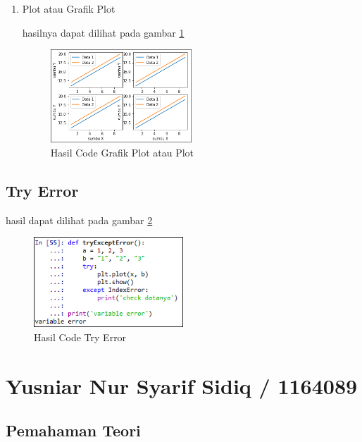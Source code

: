 \begin{enumerate}
\item Plot atau Grafik Plot 

\par hasilnya dapat dilihat pada gambar \ref{data7}
\begin{figure} [!htbp]
	\centerline{\includegraphics[width=0.5\textwidth]{figures/chapter6/1164074/5}}
	\caption{Hasil Code Grafik Plot atau Plot}
	\label{data7}
\end{figure}

\end{enumerate}
\subsection{Try Error}

\par hasil dapat dilihat pada gambar \ref{data8}
\begin{figure} [!htbp]
	\centerline{\includegraphics[width=0.5\textwidth]{figures/chapter6/1164074/8}}
	\caption{Hasil Code Try Error}
	\label{data8}
\end{figure}

\section{Yusniar Nur Syarif Sidiq / 1164089}
\subsection{Pemahaman Teori}

